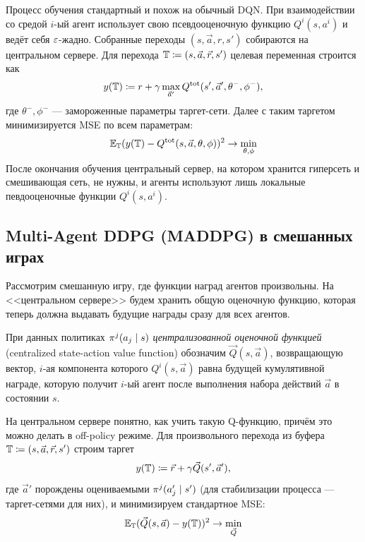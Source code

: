 Процесс обучения стандартный и похож на обычный DQN. При взаимодействии со средой $i$-ый агент использует свою псевдооценочную функцию $Q^i(s, a^i)$ и ведёт себя $\varepsilon$-жадно. Собранные переходы $(s, \vec{a}, r, s')$ собираются на центральном сервере. Для перехода $\mathbb{T} \coloneqq (s, \vec{a}, \vec{r}, s')$ целевая переменная строится как 
$$y(\mathbb{T}) \coloneqq r + \gamma \max_{\vec{a}'} Q^{\mathrm{tot}}(s', \vec{a}', \theta^-, \phi^-),$$
где $\theta^-, \phi^-$ --- замороженные параметры таргет-сети. Далее с таким таргетом минимизируется MSE по всем параметрам:
$$\mathbb{E}_{\mathbb{T}} (y(\mathbb{T}) - Q^{\mathrm{tot}}(s, \vec{a}, \theta, \phi))^2 \to \min_{\theta, \phi}$$
После окончания обучения центральный сервер, на котором хранится гиперсеть и смешивающая сеть, не нужны, и агенты используют лишь локальные певдооценочные функции $Q^i(s, a^i)$.

\subsection{Multi-Agent DDPG (MADDPG) в смешанных играх}

Рассмотрим смешанную игру, где функции наград агентов произвольны. На <<центральном сервере>> будем хранить общую оценочную функцию, которая теперь должна выдавать будущие награды сразу для всех агентов. 

\begin{definition}
При данных политиках $\pi^j(a_j \HM\mid s)$ \emph{централизованной оценочной функцией} (centralized state-action value function)  обозначим $\vec{Q}(s, \vec{a})$, возвращающую вектор, $i$-ая компонента которого $Q^i(s, \vec{a})$ равна будущей кумулятивной награде, которую получит $i$-ый агент после выполнения набора действий $\vec{a}$ в состоянии $s$.
\end{definition}

На центральном сервере понятно, как учить такую Q-функцию, причём это можно делать в off-policy режиме. Для произвольного перехода из буфера $\mathbb{T} \coloneqq (s, \vec{a}, \vec{r}, s')$ строим таргет
$$y(\mathbb{T}) \coloneqq \vec{r} + \gamma \vec{Q}(s', \vec{a}'),$$
где $\vec{a}'$ порождены оцениваемыми $\pi^j(a'_j \HM\mid s')$ (для стабилизации процесса --- таргет-сетями для них), и минимизируем стандартное MSE:
$$\mathbb{E}_{\mathbb{T}} (\vec{Q}(s, \vec{a}) - y(\mathbb{T}))^2 \to \min_{\vec{Q}}$$

